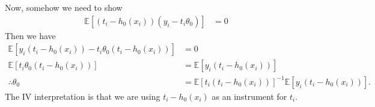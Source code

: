 \documentclass[12pt]{article}
\newcommand{\E}{\mathbb{E}}
\newcommand{\mtx}[1]{\ensuremath{\bm{\mathit{#1}}}}
\begin{document}
Now, somehow we need to show
\begin{align*}
\E[(t_i-h_0(\mtx{x}_i))(y_i - t_i\theta_0)]&=0
\end{align*}
Then we have
\begin{align*}
\E[y_i (t_i-h_0(\mtx{x}_i))- t_i\theta_0(t_i-h_0(\mtx{x}_i))]&=0\\
\E[t_i\theta_0(t_i-h_0(\mtx{x}_i))] &= \E[y_i (t_i-h_0(\mtx{x}_i))]\\
\therefore \theta_0 &= \E[t_i(t_i-h_0(\mtx{x}_i))]^{-1}\E[y_i (t_i-h_0(\mtx{x}_i))].
\end{align*}
The IV interpretation is that we are using $t_i-h_0(\mtx{x}_i)$ as an instrument for $t_i$.
\end{document}

